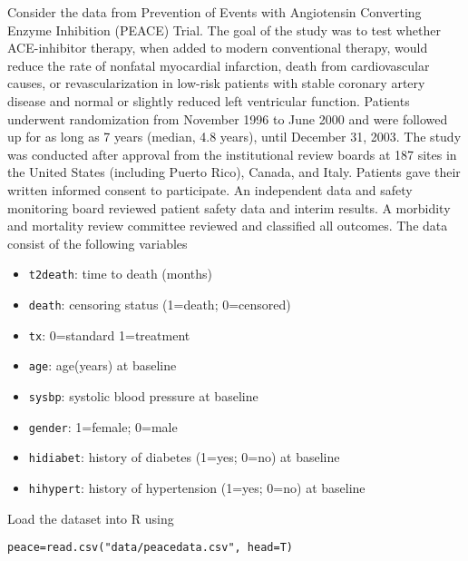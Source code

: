 \documentclass[11pt,addpoints,answers]{exam}
\begin{document}
\begin{CJK*}{UTF8}{gbsn}
\begin{questions}
\question[55]
Consider the data from Prevention of Events with Angiotensin Converting Enzyme Inhibition
(PEACE) Trial. The goal of the study was to test whether ACE-inhibitor therapy,
when added to modern conventional therapy, would reduce the rate of nonfatal myocardial
infarction, death from cardiovascular causes, or revascularization in low-risk patients with
stable coronary artery disease and normal or slightly reduced left ventricular function. Patients
underwent randomization from November 1996 to June 2000 and were followed up for
as long as 7 years (median, 4.8 years), until December 31, 2003. The study was conducted
after approval from the institutional review boards at 187 sites in the United States (including
Puerto Rico), Canada, and Italy. Patients gave their written informed consent to
participate. An independent data and safety monitoring board reviewed patient safety data
and interim results. A morbidity and mortality review committee reviewed and classified all
outcomes. The data consist of the following variables
\begin{itemize}
	\item \texttt{t2death}: time to death (months)
	\item \texttt{death}: censoring status (1=death; 0=censored)
	\item \texttt{tx}: 0=standard 1=treatment
	\item \texttt{age}: age(years) at baseline
	\item \texttt{sysbp}: systolic blood pressure at baseline
	\item \texttt{gender}: 1=female; 0=male
	\item \texttt{hidiabet}: history of diabetes (1=yes; 0=no) at baseline
	\item \texttt{hihypert}: history of hypertension (1=yes; 0=no) at baseline
\end{itemize}

Load the dataset into R using
\begin{lstlisting}
peace=read.csv("data/peacedata.csv", head=T)
\end{lstlisting}

\end{questions}
\end{CJK*}
\end{document}
